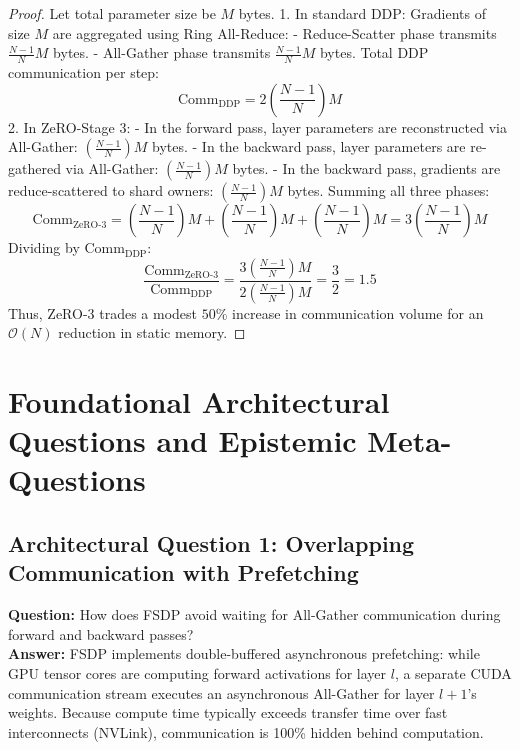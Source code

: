 \documentclass[11pt,a4paper]{article}
\theoremstyle{definition}
\begin{document}
\begin{proof}
Let total parameter size be $M$ bytes.
1. In standard DDP:
Gradients of size $M$ are aggregated using Ring All-Reduce:
- Reduce-Scatter phase transmits $\frac{N-1}{N} M$ bytes.
- All-Gather phase transmits $\frac{N-1}{N} M$ bytes.
Total DDP communication per step:
{\boldmath
\begin{equation}
\text{Comm}_{\text{DDP}} = 2 \left( \frac{N-1}{N} \right) M
\end{equation}
}
2. In ZeRO-Stage 3:
- In the forward pass, layer parameters are reconstructed via All-Gather: $\left( \frac{N-1}{N} \right) M$ bytes.
- In the backward pass, layer parameters are re-gathered via All-Gather: $\left( \frac{N-1}{N} \right) M$ bytes.
- In the backward pass, gradients are reduce-scattered to shard owners: $\left( \frac{N-1}{N} \right) M$ bytes.
Summing all three phases:
{\boldmath
\begin{equation}
\text{Comm}_{\text{ZeRO-3}} = \left( \frac{N-1}{N} \right) M + \left( \frac{N-1}{N} \right) M + \left( \frac{N-1}{N} \right) M = 3 \left( \frac{N-1}{N} \right) M
\end{equation}
}
Dividing by $\text{Comm}_{\text{DDP}}$:
{\boldmath
\begin{equation}
\frac{\text{Comm}_{\text{ZeRO-3}}}{\text{Comm}_{\text{DDP}}} = \frac{3 \left( \frac{N-1}{N} \right) M}{2 \left( \frac{N-1}{N} \right) M} = \frac{3}{2} = 1.5
\end{equation}
}
Thus, ZeRO-3 trades a modest $50\%$ increase in communication volume for an $\mathcal{O}(N)$ reduction in static memory.
\end{proof}

\section{Foundational Architectural Questions and Epistemic Meta-Questions}

\subsection{Architectural Question 1: Overlapping Communication with Prefetching}
\textbf{Question:} How does FSDP avoid waiting for All-Gather communication during forward and backward passes?\\
\textbf{Answer:} FSDP implements double-buffered asynchronous prefetching: while GPU tensor cores are computing forward activations for layer $l$, a separate CUDA communication stream executes an asynchronous All-Gather for layer $l+1$'s weights. Because compute time typically exceeds transfer time over fast interconnects (NVLink), communication is 100\% hidden behind computation.
\end{document}
